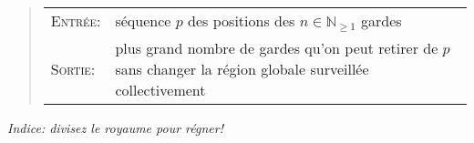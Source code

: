\documentclass{article}
\newcommand{\N}{\mathbb{N}}                      %
\begin{document}
\begin{question}
\begin{enumerate}[(a)]
    \begin{quote}
      \vspace*{6pt}
      \begin{tabular}{lp{10cm}}
        \textsc{Entrée}: & séquence $p$ des positions des $n \in
        \N_{\geq 1}$ gardes \\[2pt]
        
        \textsc{Sortie}: & plus grand nombre de gardes qu'on peut
        retirer de $p$ sans changer la région globale surveillée
        collectivement
      \end{tabular}
      \vspace*{5pt}
    \end{quote}
    \emph{Indice: divisez le royaume pour régner!}
    
  \end{enumerate}
\end{question}

\pagebreak
\end{document}
